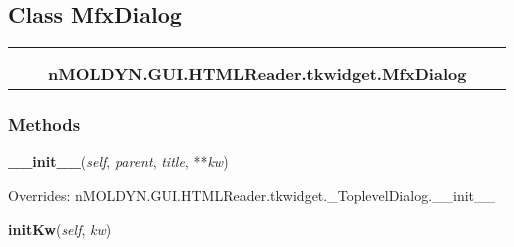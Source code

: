 \subsection{Class MfxDialog}

    \label{nMOLDYN:GUI:HTMLReader:tkwidget:MfxDialog}
\begin{tabular}{cccccc}
\multicolumn{2}{r}{\settowidth{\BCL}{nMOLDYN.GUI.HTMLReader.tkwidget.\_ToplevelDialog}\multirow{2}{\BCL}{nMOLDYN.GUI.HTMLReader.tkwidget.\_ToplevelDialog}}
&&
  \\\cline{3-3}
  &&\multicolumn{1}{c|}{}
&&
  \\
&&\multicolumn{2}{l}{\textbf{nMOLDYN.GUI.HTMLReader.tkwidget.MfxDialog}}
\end{tabular}



  \subsubsection{Methods}

    \vspace{0.5ex}

\hspace{.8\funcindent}\begin{boxedminipage}{\funcwidth}

    \raggedright \textbf{\_\_init\_\_}(\textit{self}, \textit{parent}, \textit{title}, **\textit{kw})

\setlength{\parskip}{2ex}
\setlength{\parskip}{1ex}
      Overrides: nMOLDYN.GUI.HTMLReader.tkwidget.\_ToplevelDialog.\_\_init\_\_

    \end{boxedminipage}

    \label{nMOLDYN:GUI:HTMLReader:tkwidget:MfxDialog:initKw}

    \vspace{0.5ex}

\hspace{.8\funcindent}\begin{boxedminipage}{\funcwidth}

    \raggedright \textbf{initKw}(\textit{self}, \textit{kw})

\setlength{\parskip}{2ex}
\setlength{\parskip}{1ex}
    \end{boxedminipage}

